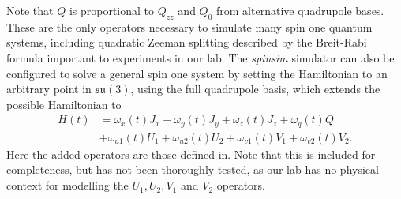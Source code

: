 \documentclass{jors}
\begin{document}
		Note that \(Q\) is proportional to \(Q_{zz}\)\cite{hamley_spin-nematic_2012} and \(Q_0\)\cite{di_dipolequadrupole_2010} from alternative quadrupole bases.
		These are the only operators necessary to simulate many spin one quantum systems, including quadratic Zeeman splitting described by the Breit-Rabi formula\cite{mockler_atomic_1961} important to experiments in our lab.
		The \emph{spinsim} simulator can also be configured to solve a general spin one system by setting the Hamiltonian to an arbitrary point in \(\mathfrak{su}(3)\), using the full quadrupole basis, which extends the possible Hamiltonian to
		\begin{align}
			H(t) &= \omega_x(t) J_x + \omega_y(t) J_y + \omega_z(t) J_z + \omega_q(t) Q\nonumber\\
			&+ \omega_{u1}(t) U_1 + \omega_{u2}(t) U_2 + \omega_{v1}(t) V_1 + \omega_{v2}(t) V_2.
		\end{align}
		Here the added operators are those defined in\cite{di_dipolequadrupole_2010}. Note that this is included for completeness, but has not been thoroughly tested, as our lab has no physical context for modelling the \(U_1, U_2, V_1\) and \(V_2\) operators.




\end{document}
